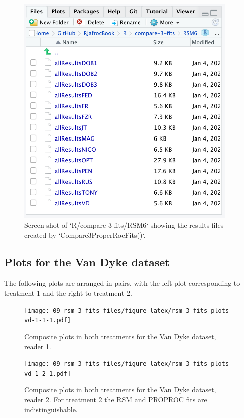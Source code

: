 \documentclass[
]{book}
\begin{document}
\begin{figure}

{\centering \includegraphics[width=300pt]{images/compare-3-fits/RSM6} 

}

\caption{Screen shot of `R/compare-3-fits/RSM6` showing the results files created by  `Compare3ProperRocFits()`.}\label{fig:rsm-3-fits-all-results-rsm6}
\end{figure}

\hypertarget{rsm-3-fits-all-plots-van-dyke}{%
\subsection{Plots for the Van Dyke dataset}\label{rsm-3-fits-all-plots-van-dyke}}

The following plots are arranged in pairs, with the left plot corresponding to treatment 1 and the right to treatment 2.

\begin{figure}
\centering
\texttt{[image: 09-rsm-3-fits\_files/figure-latex/rsm-3-fits-plots-vd-1-1-1.pdf]}
\caption{\label{fig:rsm-3-fits-plots-vd-1-1}Composite plots in both treatments for the Van Dyke dataset, reader 1.}
\end{figure}

\begin{figure}
\centering
\texttt{[image: 09-rsm-3-fits\_files/figure-latex/rsm-3-fits-plots-vd-1-2-1.pdf]}
\caption{\label{fig:rsm-3-fits-plots-vd-1-2}Composite plots in both treatments for the Van Dyke dataset, reader 2. For treatment 2 the RSM and PROPROC fits are indistinguishable.}
\end{figure}
\end{document}
